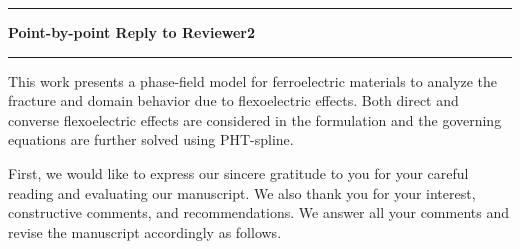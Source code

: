 \documentclass[12pt,fleqn]{article}
\begin{document}
\begin{flushleft}
    \vspace{1em} 
    \hrule
    \vspace{1em} 
    \textbf{Point-by-point Reply to Reviewer2}
    \vspace{1em} 
    \hrule
    \vspace{1em} 
\end{flushleft}
\begin{question}{}
This work presents a phase-field model for ferroelectric materials to analyze the fracture and domain behavior due to flexoelectric effects. Both direct and converse flexoelectric effects are considered in the formulation and the governing equations are further solved using PHT-spline.
\end{question}
\begin{response}
    First, we would like to express our sincere gratitude to you for your careful reading and evaluating our manuscript. We also thank you for your interest, constructive comments, and recommendations. We answer all your comments and revise the manuscript accordingly as follows.
\end{response}
\end{document}
